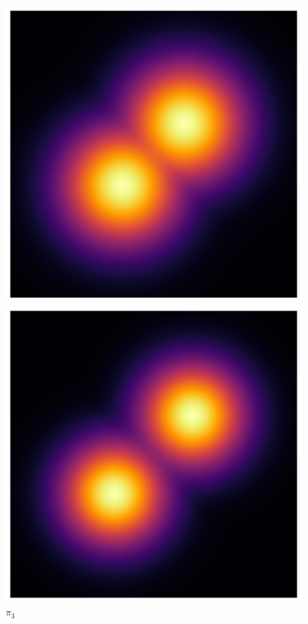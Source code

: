 \begin{figure}[t]
\begin{minipage}{0.15\textwidth}
      \caption*{$\pi_2$}
    \end{minipage}
    \begin{minipage}{0.15\textwidth}
      \centering
      \includegraphics[width=\textwidth]{../img/heatmap_path_3.pdf}
      \caption*{$\pi_3$}
    \end{minipage}
    \begin{minipage}{0.15\textwidth}
      \centering
      \includegraphics[width=\textwidth]{../img/heatmap_path_4.pdf}

\end{minipage}
\end{figure}
